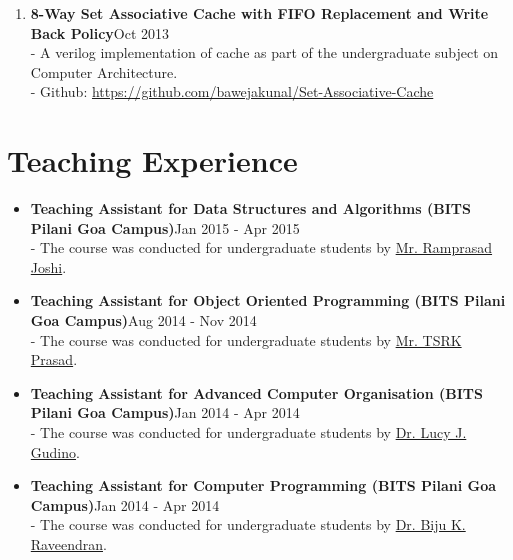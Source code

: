 \documentclass{article}
\begin{document}
\begin{enumerate}
    \item \textbf{8-Way Set Associative Cache with FIFO Replacement and Write Back Policy}{\hfill Oct 2013}\\
    - A verilog implementation of cache as part of the undergraduate subject on Computer Architecture.\\
    - Github: \href{https://github.com/bawejakunal/Set-Associative-Cache}{https://github.com/bawejakunal/Set-Associative-Cache}
    
\end{enumerate}

\section*{Teaching Experience}
\begin{itemize}
    \item \textbf{Teaching Assistant for Data Structures and Algorithms (BITS Pilani Goa Campus)}{\hfill Jan 2015 - Apr 2015}\\
    - The course was conducted for undergraduate students by \href{http://www.bits-pilani.ac.in/goa/rsj/profile}{Mr. Ramprasad Joshi}.
    
    \item \textbf{Teaching Assistant for Object Oriented Programming (BITS Pilani Goa Campus)}{\hfill Aug 2014 - Nov 2014}\\
    - The course was conducted for undergraduate students by \href{http://universe.bits-pilani.ac.in/goa/tsrkp/Profile}{Mr. TSRK Prasad}.
    
    \item \textbf{Teaching Assistant for Advanced Computer Organisation (BITS Pilani Goa Campus)}{\hfill Jan 2014 - Apr 2014}\\
    - The course was conducted for undergraduate students by \href{http://www.bits-pilani.ac.in/goa/lucy/profile}{Dr. Lucy J. Gudino}.
    
    \item \textbf{Teaching Assistant for Computer Programming (BITS Pilani Goa Campus)}{\hfill Jan 2014 - Apr 2014}\\
    - The course was conducted for undergraduate students by \href{http://universe.bits-pilani.ac.in/goa/biju/profile}{Dr. Biju K. Raveendran}.
\end{itemize}
\end{document}
